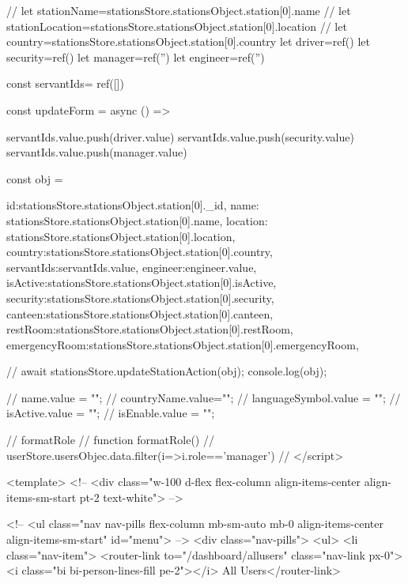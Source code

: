 // let stationName=stationsStore.stationsObject.station[0].name
// let stationLocation=stationsStore.stationsObject.station[0].location
// let country=stationsStore.stationsObject.station[0].country
let driver=ref()
let security=ref()
let manager=ref('')
let engineer=ref('')





const servantIds= ref([])

const updateForm = async () => {
    
    servantIds.value.push(driver.value)
    servantIds.value.push(security.value)
    servantIds.value.push(manager.value)

    const obj = {
        id:stationsStore.stationsObject.station[0]._id,
        name: stationsStore.stationsObject.station[0].name,
        location: stationsStore.stationsObject.station[0].location,
        country:stationsStore.stationsObject.station[0].country,
        servantIds:servantIds.value,
        engineer:engineer.value,
        isActive:stationsStore.stationsObject.station[0].isActive,
        security:stationsStore.stationsObject.station[0].security,
        canteen:stationsStore.stationsObject.station[0].canteen,
        restRoom:stationsStore.stationsObject.station[0].restRoom,
        emergencyRoom:stationsStore.stationsObject.station[0].emergencyRoom,


    }
    // await stationsStore.updateStationAction(obj);
   console.log(obj);

    // name.value = "";
    // countryName.value="";
    // languageSymbol.value = "";
    // isActive.value = "";
    // isEnable.value = "";

   
}



// formatRole
// function formatRole(){
//     userStore.usersObjec.data.filter(i=>i.role=='manager')
// }
</script>






<template>
    <!-- <div class="w-100 d-flex flex-column align-items-center align-items-sm-start pt-2 text-white"> -->
       
        <!-- <ul class="nav nav-pills flex-column mb-sm-auto mb-0 align-items-center align-items-sm-start" id="menu"> -->
            <div class="nav-pills">
            <ul>
            <li class="nav-item">
                <router-link to="/dashboard/allusers" class="nav-link px-0"><i class="bi bi-person-lines-fill pe-2"></i> All Users</router-link>

